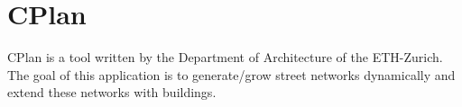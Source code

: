 \section{CPlan}
\label{CPlan}
CPlan is a tool written by the Department of Architecture of the ETH-Zurich. The goal of this application is to generate/grow street networks dynamically and extend these networks with buildings.